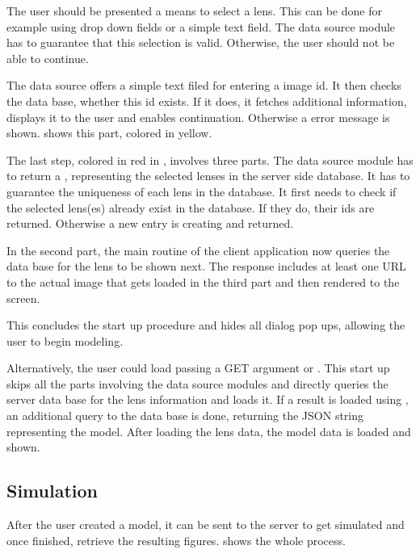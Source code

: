 

The user should be presented a means to select a lens.
This can be done for example using drop down fields or a simple text field.
The data source module has to guarantee that this selection is valid.
Otherwise, the user should not be able to continue.

The \sw data source offers a simple text filed for entering a \sw image id.
It then checks the \sw data base, whether this id exists.
If it does, it fetches additional information, displays it to the user and enables continuation.
Otherwise a error message is shown.
 shows this part, colored in yellow.

The last step, colored in red in , involves three parts.
The data source module has to return a , representing the selected lenses in the server side database.
It has to guarantee the uniqueness of each lens in the database.
It first needs to check if the selected lens(es) already exist in the database.
If they do, their ids are returned. Otherwise a new entry is creating and returned.

In the second part, the main routine of the client application now queries the data base for the lens to be shown next.
The response includes at least one URL to the actual image that gets loaded in the third part and then rendered to the screen.

This concludes the start up procedure and hides all dialog pop ups, allowing the user to begin modeling.

Alternatively, the user could load \spl passing a GET argument  or .
This start up skips all the parts involving the data source modules and directly queries the server data base for the lens information and loads it.
If a result is loaded using , an additional query to the data base is done, returning the JSON string representing the model.
After loading the lens data, the model data is loaded and shown.



\subsection{Simulation}

After the user created a model, it can be sent to the server to get simulated and once finished, retrieve the resulting figures.  shows the whole process.

